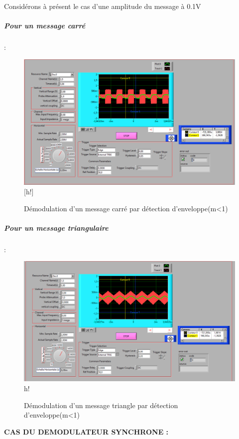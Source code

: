 \documentclass[french]{article}
\begin{document}
Considérons à présent le cas d'une amplitude du message à 0.1V
\newpage
\subparagraph{Pour un message carré} : \\
\begin{figure}[!h]
\includegraphics[width=\textwidth]{carre_enveloppe_01.png}[h!]
\caption{Démodulation d'un message carré par détection d'enveloppe(m<1)}
\end{figure}

\newpage
\subparagraph{Pour un message triangulaire} : \\
\begin{figure}[!h]
\includegraphics[width=\textwidth]{enveloppe_01_triangle.png}{h!}
\caption{Démodulation d'un message triangle par détection d'enveloppe(m<1)}
\end{figure}

\newpage
\textbf{CAS DU DEMODULATEUR SYNCHRONE :}\\
\end{document}
